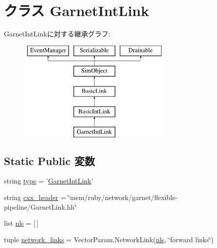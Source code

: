\hypertarget{classGarnetLink_1_1GarnetIntLink}{
\section{クラス GarnetIntLink}
\label{classGarnetLink_1_1GarnetIntLink}
}
GarnetIntLinkに対する継承グラフ:\begin{figure}[H]
\begin{center}
\leavevmode
\includegraphics[height=5cm]{classGarnetLink_1_1GarnetIntLink}
\end{center}
\end{figure}
\subsection*{Static Public 変数}
\begin{DoxyCompactItemize}
\item 
string \hyperlink{classGarnetLink_1_1GarnetIntLink_acce15679d830831b0bbe8ebc2a60b2ca}{type} = '\hyperlink{classGarnetLink_1_1GarnetIntLink}{GarnetIntLink}'
\item 
string \hyperlink{classGarnetLink_1_1GarnetIntLink_a17da7064bc5c518791f0c891eff05fda}{cxx\_\-header} = \char`\"{}mem/ruby/network/garnet/flexible-\/pipeline/GarnetLink.hh\char`\"{}
\item 
list \hyperlink{classGarnetLink_1_1GarnetIntLink_af11789bfc44615f3244deb3cf6054da9}{nls} = \mbox{[}$\,$\mbox{]}
\item 
tuple \hyperlink{classGarnetLink_1_1GarnetIntLink_a8bbf0848b3bec491562615b151d5c318}{network\_\-links} = VectorParam.NetworkLink(\hyperlink{classGarnetLink_1_1GarnetIntLink_af11789bfc44615f3244deb3cf6054da9}{nls}, \char`\"{}forward links\char`\"{})
\end{DoxyCompactItemize}


